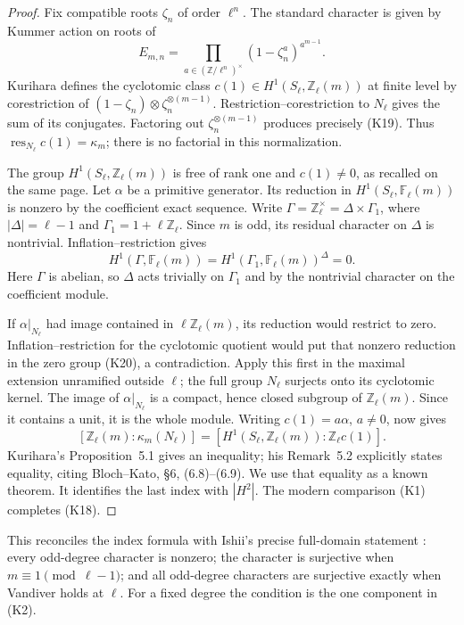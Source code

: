 \begin{proof}
Fix compatible roots \(\zeta_n\) of order \(\ell^n\).
The standard character is given by Kummer action on roots of
\[
 E_{m,n}=
 \prod_{a\in(\mathbb Z/\ell^n)^\times}
       (1-\zeta_n^a)^{a^{m-1}}.                    \tag{K19}
\]
Kurihara \cite[p.~233, (4)]{Kurihara1992} defines the
cyclotomic class \(c(1)\in H^1(S_\ell,\mathbb Z_\ell(m))\)
at finite level by corestriction of
\((1-\zeta_n)\otimes\zeta_n^{\otimes(m-1)}\).
Restriction--corestriction to \(N_\ell\) gives the sum
of its conjugates. Factoring out
\(\zeta_n^{\otimes(m-1)}\) produces precisely (K19).
Thus \(\operatorname{res}_{N_\ell}c(1)=\kappa_m\);
there is no factorial in this normalization.

The group \(H^1(S_\ell,\mathbb Z_\ell(m))\) is free of
rank one and \(c(1)\ne0\), as recalled on the same page.
Let \(\alpha\) be a primitive generator. Its reduction in
\(H^1(S_\ell,\mathbb F_\ell(m))\) is nonzero by the
coefficient exact sequence. Write
\(\Gamma=\mathbb Z_\ell^\times=\Delta\times\Gamma_1\),
where \(|\Delta|=\ell-1\) and \(\Gamma_1=1+\ell\mathbb Z_\ell\).
Since \(m\) is odd, its residual character on \(\Delta\)
is nontrivial. Inflation--restriction gives
\[
 H^1(\Gamma,\mathbb F_\ell(m))
 =H^1(\Gamma_1,\mathbb F_\ell(m))^\Delta=0.           \tag{K20}
\]
Here \(\Gamma\) is abelian, so \(\Delta\) acts trivially
on \(\Gamma_1\) and by the nontrivial character on the
coefficient module.

If \(\alpha|_{N_\ell}\) had image contained in
\(\ell\mathbb Z_\ell(m)\), its reduction would restrict
to zero. Inflation--restriction for the cyclotomic quotient
would put that nonzero reduction in the zero group (K20),
a contradiction. Apply this first in the maximal extension
unramified outside \(\ell\); the full group \(N_\ell\)
surjects onto its cyclotomic kernel. The image of
\(\alpha|_{N_\ell}\) is a compact, hence closed subgroup
of \(\mathbb Z_\ell(m)\). Since it contains a unit,
it is the whole module.
Writing \(c(1)=a\alpha\), \(a\ne0\), now gives
\[
 [\mathbb Z_\ell(m):\kappa_m(N_\ell)]
 =[H^1(S_\ell,\mathbb Z_\ell(m)):\mathbb Z_\ell c(1)].
\]
Kurihara's Proposition~5.1 gives an inequality; his
Remark~5.2 explicitly states equality, citing Bloch--Kato,
\S6, (6.8)--(6.9). We use that equality as a known
theorem. It identifies the last index with \(|H^2|\).
The modern comparison (K1) completes (K18).
\end{proof}

This reconciles the index formula with Ishii's precise
full-domain statement \cite[Theorem~1.1, p.~2]{IshiiKummer2024}:
every odd-degree character is nonzero; the character is
surjective when \(m\equiv1\pmod{\ell-1}\); and all odd-degree
characters are surjective exactly when Vandiver holds at
\(\ell\). For a fixed degree the condition is the one
component in (K2).

